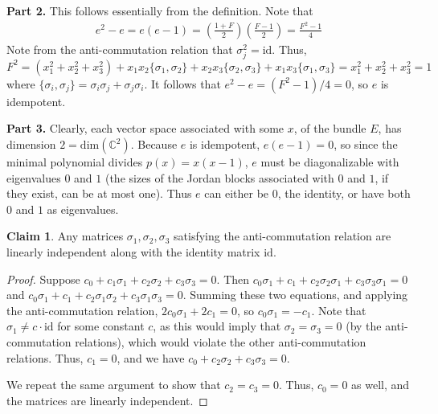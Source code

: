 \documentclass[aps,pra,showpacs,notitlepage,onecolumn,superscriptaddress,nofootinbib]{revtex4-1}
\theoremstyle{definition}
\newtheorem{claim}{Claim}[section]
\begin{document}
\noindent \textbf{Part 2.} This follows essentially from the definition. Note that
\begin{align}
  e^2 - e = e(e - 1) = \left( \frac{1 + F}{2} \right) \left( \frac{F - 1}{2} \right) = \frac{F^2 - 1}{4}
\end{align}
Note from the anti-commutation relation that $\sigma_j^2 = \text{id}$. Thus,
\begin{equation}
  F^2 = (x_1^2 + x_2^2 + x_3^2) + x_1 x_2 \{\sigma_1, \sigma_2\} + x_2 x_3 \{\sigma_2, \sigma_3\} + x_1 x_3 \{\sigma_1, \sigma_3\} = x_1^2 + x_2^2 + x_3^2 = 1
\end{equation}
where $\{\sigma_i, \sigma_j\} = \sigma_i \sigma_j + \sigma_j \sigma_i$. It follows that $e^2 - e = (F^2 - 1)/4 = 0$, so $e$ is idempotent.
\newline

\noindent \textbf{Part 3.} Clearly, each vector space associated with some $x$, of the bundle $E$, has dimension $2 = \text{dim}(\mathbb{C}^2)$. Because $e$ is idempotent, $e(e - 1) = 0$,
so since the minimal polynomial divides $p(x) = x(x - 1)$, $e$ must be diagonalizable with eigenvalues $0$ and $1$ (the sizes of the Jordan blocks associated with $0$ and $1$, if they exist,
can be at most one). Thus $e$ can either be $0$, the identity, or have both $0$ and $1$ as eigenvalues.

\begin{claim}
  Any matrices $\sigma_1, \sigma_2, \sigma_3$ satisfying the anti-commutation relation are linearly independent along with the identity matrix $\text{id}$.
\end{claim}
\begin{proof}
  Suppose $c_0 + c_1 \sigma_1 + c_2 \sigma_2 + c_3 \sigma_3 = 0$. Then $c_0 \sigma_1 + c_1 + c_2 \sigma_2 \sigma_1 + c_3 \sigma_3 \sigma_1 = 0$ and $c_0 \sigma_1 + c_1 + c_2 \sigma_1 \sigma_2 + c_3 \sigma_1 \sigma_3 = 0$.
  Summing these two equations, and applying the anti-commutation relation, $2c_0 \sigma_1 + 2c_1 = 0$, so $c_0 \sigma_1 = -c_1$. Note that $\sigma_1 \neq c \cdot \text{id}$ for some constant $c$, as this would imply that $\sigma_2 = \sigma_3 = 0$ (by the anti-commutation relations),
  which would violate the other anti-commutation relations. Thus, $c_1 = 0$, and we have $c_0 + c_2 \sigma_2 + c_3 \sigma_3 = 0$.

  We repeat the same argument to show that $c_2 = c_3 = 0$. Thus, $c_0 = 0$ as well, and the matrices are linearly independent.
\end{proof}
\end{document}
